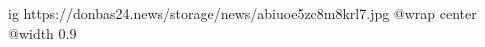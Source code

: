  
 
 
 
 

\ifcmt
  ig https://donbas24.news/storage/news/abiuoe5zc8m8krl7.jpg
  @wrap center
  @width 0.9
\fi
